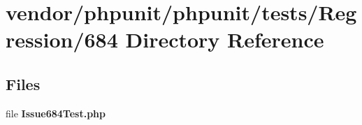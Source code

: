 \section{vendor/phpunit/phpunit/tests/\+Regression/684 Directory Reference}
\label{dir_2661b16f952a26098ed67db1be818382}
\subsection*{Files}
\begin{DoxyCompactItemize}
\item 
file {\bf Issue684\+Test.\+php}
\end{DoxyCompactItemize}
